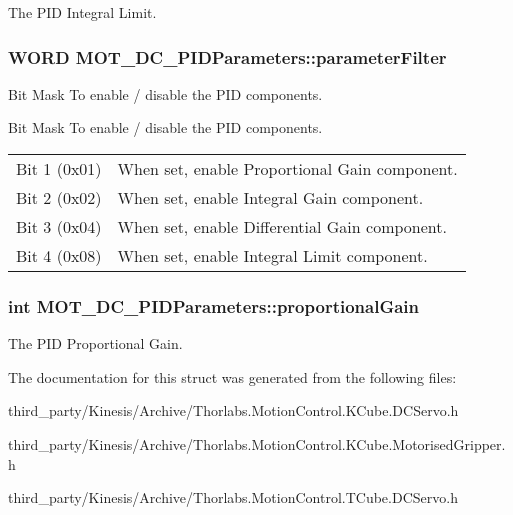 The P\+ID Integral Limit. 

\subsubsection[{\texorpdfstring{parameter\+Filter}{parameterFilter}}]{\setlength{\rightskip}{0pt plus 5cm}W\+O\+RD M\+O\+T\+\_\+\+D\+C\+\_\+\+P\+I\+D\+Parameters\+::parameter\+Filter}\hypertarget{struct_m_o_t___d_c___p_i_d_parameters_a60c568a8d192dd2577b285d8f0bd76d5}{}\label{struct_m_o_t___d_c___p_i_d_parameters_a60c568a8d192dd2577b285d8f0bd76d5}


Bit Mask To enable / disable the P\+ID components. 

Bit Mask To enable / disable the P\+ID components. \tabulinesep=1mm
\begin{longtabu} spread 0pt [c]{*2{|X[-1]}|}
\hline
Bit 1 (0x01)&When set, enable Proportional Gain component. \\
Bit 2 (0x02)&When set, enable Integral Gain component. \\
Bit 3 (0x04)&When set, enable Differential Gain component. \\
Bit 4 (0x08)&When set, enable Integral Limit component. \\
\end{longtabu}
\subsubsection[{\texorpdfstring{proportional\+Gain}{proportionalGain}}]{\setlength{\rightskip}{0pt plus 5cm}int M\+O\+T\+\_\+\+D\+C\+\_\+\+P\+I\+D\+Parameters\+::proportional\+Gain}\hypertarget{struct_m_o_t___d_c___p_i_d_parameters_a451cab59cf2180122335beb88549e867}{}\label{struct_m_o_t___d_c___p_i_d_parameters_a451cab59cf2180122335beb88549e867}


The P\+ID Proportional Gain. 



The documentation for this struct was generated from the following files\+:\begin{DoxyCompactItemize}
\item 
third\+\_\+party/\+Kinesis/\+Archive/Thorlabs.\+Motion\+Control.\+K\+Cube.\+D\+C\+Servo.\+h\item 
third\+\_\+party/\+Kinesis/\+Archive/Thorlabs.\+Motion\+Control.\+K\+Cube.\+Motorised\+Gripper.\+h\item 
third\+\_\+party/\+Kinesis/\+Archive/Thorlabs.\+Motion\+Control.\+T\+Cube.\+D\+C\+Servo.\+h\end{DoxyCompactItemize}
